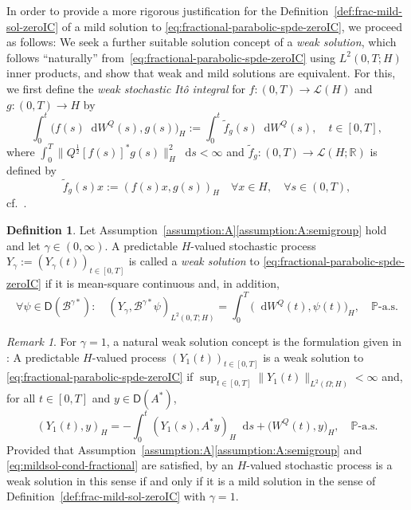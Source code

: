 \documentclass[reqno]{amsart}
\numberwithin{equation}{section}
\newcommand{\bbP}{\mathbb{P}}
\newcommand{\R}{\mathbb{R}}
\newcommand{\cB}{\mathcal{B}}
\newcommand{\norm}[2]{     \| #1       \|_{ #2 }}
\newcommand{\rd}{\mathop{}\!\mathrm{d}}
\newcommand{\from}{\colon}
\newcommand{\dual}[1]{#1^*}
\theoremstyle{remark}
\newtheorem{remark}[lemma]{Remark}
\theoremstyle{definition}
\newtheorem{definition}[lemma]{Definition}
\begin{document}
In order to provide a more rigorous justification for 
the Definition~\textup{\ref{def:frac-mild-sol-zeroIC}}
of a mild solution 
to \eqref{eq:fractional-parabolic-spde-zeroIC}, 
we proceed as follows: 
We seek a further suitable solution concept 
of a \emph{weak solution}, 
which follows ``naturally'' 
from~\eqref{eq:fractional-parabolic-spde-zeroIC} 
using $L^2(0,T;H)$ inner products, 
and show that weak and mild solutions 
are equivalent. 
%
For this, we first define the \emph{weak stochastic It\^o integral} 
for $f\colon (0,T)\to \mathscr L(H)$ and 
$g\colon (0,T) \to H$
by 
%
\[ 
\int_0^t 
\bigl( f(s) \rd W^Q(s), g(s) \bigr)_{H} 
:=
\int_0^t \widetilde{f}_g(s) \rd W^Q(s), 
\quad t \in [0,T],
\]
%
where 
$\int_0^T \bigl\| Q^{\frac{1}{2}} \dual{[f(s)]} g(s) \bigr\|_{H}^2 \rd s < \infty$  
and 
$\widetilde{f}_g \from (0,T) \to \mathscr L(H;\R)$ 
is defined by
%
\[ 
\widetilde{f}_g(s) x 
:= 
( f(s) x, g(s) )_{H}  
\quad  
\forall 
x \in H, 
\quad 
\forall 
s\in(0,T), 
\]
cf.~\cite[Lemma~2.4.2]{LiuRockner2015}.
% 

\begin{definition}\label{def:frac-weak-sol-zeroIC} 
	Let Assumption~\textup{\ref{assumption:A}\ref{assumption:A:semigroup}}  
	hold and let $\gamma \in (0,\infty)$.
	A predictable $H$-valued stochastic process 
	$Y_\gamma:=(Y_\gamma(t))_{t\in[0,T]}$ is called a \emph{weak solution} 
	to \eqref{eq:fractional-parabolic-spde-zeroIC} if 
	it is mean-square continuous  
	and, in addition, 
	\begin{equation}\label{eq:fractional-weaksol-zeroIC}  
	\forall 
	\psi \in \mathsf D(\cB^{\gamma*}) : 
	\quad 
	( Y_\gamma, \cB^{\gamma*}\psi)_{L^2(0,T;H)} 
	= 
	\int_0^T \bigl( \rd W^Q(t), \psi(t) \bigr)_H, 
	\quad 
	\bbP\text{-a.s.} 
	\end{equation}
\end{definition}

\begin{remark} For $\gamma=1$, a natural weak solution concept 
	is the formulation given in 
	\cite[Definition~9.11]{Peszat_zabczyk_2007}: 
	A predictable $H$-valued process $(Y_1(t))_{t\in[0,T]}$ 
	is a weak solution to \eqref{eq:fractional-parabolic-spde-zeroIC} 
	if $\sup_{t\in[0,T]} \norm{ Y_1(t) }{L^2(\Omega;H)} < \infty$ 
	and, for all $t \in [0,T]$ and $y \in \mathsf D(\dual A)$, 
	\[ 
	(Y_1(t), y)_H 
	= 
	- 
	\int_0^t (Y_1(s), \dual A y)_H \rd s 
	+ 
	\bigl( W^Q(t), y \bigr)_H, 
	\quad 
	\text{$\bbP$-a.s.}
	\] 
	Provided that Assumption~\textup{\ref{assumption:A}\ref{assumption:A:semigroup}}
	and \eqref{eq:mildsol-cond-fractional} are satisfied, 
	by \cite[Theorem~9.15]{Peszat_zabczyk_2007} 
	an $H$-valued stochastic process is 
	a weak solution in this sense 
	if and only if it 
	is a mild solution 
	in the sense of 
	Definition~\textup{\ref{def:frac-mild-sol-zeroIC}} 
	with $\gamma=1$. 
\end{remark} 
\end{document}
